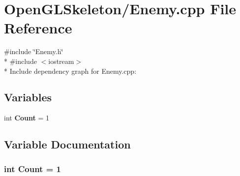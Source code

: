\section{Open\+G\+L\+Skeleton/\+Enemy.cpp File Reference}
\label{_enemy_8cpp}
{\ttfamily \#include \char`\"{}Enemy.\+h\char`\"{}}\\*
{\ttfamily \#include $<$iostream$>$}\\*
Include dependency graph for Enemy.\+cpp\+:
\subsection*{Variables}
\begin{DoxyCompactItemize}
\item 
int {\bf Count} = 1
\end{DoxyCompactItemize}


\subsection{Variable Documentation}
\subsubsection[{Count}]{\setlength{\rightskip}{0pt plus 5cm}int Count = 1}\label{_enemy_8cpp_aad462966ed963f892117056de1eba502}

